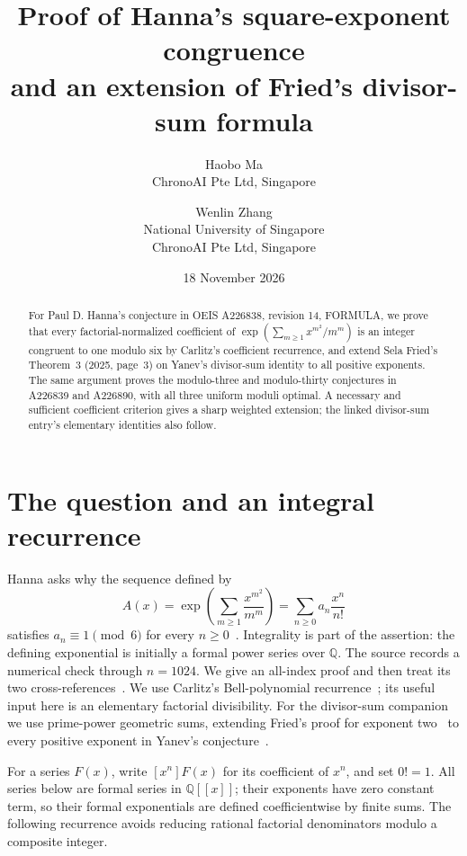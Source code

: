 \documentclass[11pt]{article}
\title{Proof of Hanna's square-exponent congruence\texorpdfstring{\\}{ }and an extension of Fried's divisor-sum formula}
\author{Haobo Ma\\\small ChronoAI Pte Ltd, Singapore
\and Wenlin Zhang\\\small National University of Singapore\\\small ChronoAI Pte Ltd, Singapore}
\date{18 November 2026}
\DeclareMathOperator{\ex}{exp}
\begin{document}
\maketitle
\begin{abstract}
For Paul D. Hanna's conjecture in OEIS A226838, revision 14, FORMULA,
we prove that every factorial-normalized coefficient of
$\exp(\sum_{m\geq1}x^{m^2}/m^m)$ is an integer congruent to one modulo six
by Carlitz's coefficient recurrence, and extend Sela Fried's
Theorem~3 (2025, page~3) on Yanev's divisor-sum identity to all positive exponents.
The same argument proves the modulo-three and modulo-thirty conjectures
in A226839 and A226890, with all three uniform moduli optimal.
A necessary and sufficient coefficient criterion gives a sharp weighted
extension; the linked divisor-sum entry's elementary identities also follow.
\end{abstract}

\section{The question and an integral recurrence}

Hanna asks why the sequence defined by
\begin{equation}\label{eq:square}
 A(x)=\ex\!\left(\sum_{m\geq1}\frac{x^{m^2}}{m^m}\right)
      =\sum_{n\geq0}a_n\frac{x^n}{n!}
\end{equation}
satisfies $a_n\equiv1\pmod6$ for every $n\geq0$~\cite{square}.
Integrality is part of the assertion: the defining exponential is initially
a formal power series over $\mathbb Q$.
The source records a numerical check through $n=1024$.
We give an all-index proof and then treat its two cross-references~\cite{triangle,weighted}.
We use Carlitz's Bell-polynomial recurrence~\cite[\S2, (2.1)--(2.2)]{carlitz};
its useful input here is an elementary factorial divisibility.
For the divisor-sum companion we use prime-power geometric sums, extending
Fried's proof for exponent two~\cite[Theorem~3, p.~3]{fried} to every positive
exponent in Yanev's conjecture~\cite[FORMULA, 24 August 2017]{divisors}.

For a series $F(x)$, write $[x^n]F(x)$ for its coefficient of $x^n$,
and set $0!=1$. All series below are formal series in $\mathbb Q[[x]]$;
their exponents have zero constant term, so their formal exponentials
are defined coefficientwise by finite sums.
The following recurrence avoids reducing rational factorial denominators
modulo a composite integer.
\end{document}
